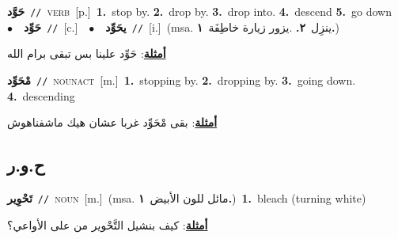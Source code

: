 \documentclass[10pt,a4paper,twoside]{article} %
\begin{document}
\begin{multicols}{2}
{\setlength\topsep{0pt}\textbf{\foreignlanguage{arabic}{حَوَّد}}\ {\color{gray}\texttt{//}\color{black}}\ \textsc{verb}\ [p.]\ \textbf{1.}~stop by.  \textbf{2.}~drop by.  \textbf{3.}~drop into.  \textbf{4.}~descend  \textbf{5.}~go down\ \ $\bullet$\ \ \setlength\topsep{0pt}\textbf{\foreignlanguage{arabic}{حَوِّد}}\ {\color{gray}\texttt{//}\color{black}}\ [c.]\ \ $\bullet$\ \ \setlength\topsep{0pt}\textbf{\foreignlanguage{arabic}{يحَوِّد}}\ {\color{gray}\texttt{//}\color{black}}\ [i.]\ \color{gray}(msa. \foreignlanguage{arabic}{ينزِل}~\foreignlanguage{arabic}{\textbf{٢.}}  .\foreignlanguage{arabic}{يزور زيارة خاطِفَة}~\foreignlanguage{arabic}{\textbf{١.}})\color{black}\  \begin{flushright}\color{gray}\foreignlanguage{arabic}{\textbf{\underline{\foreignlanguage{arabic}{أمثلة}}}: حَوِّد علينا بس تبقى برام الله}\end{flushright}\color{black}} \vspace{2mm}

{\setlength\topsep{0pt}\textbf{\foreignlanguage{arabic}{مْحَوِّد}}\ {\color{gray}\texttt{//}\color{black}}\ \textsc{noun\textunderscore act}\ [m.]\ \textbf{1.}~stopping by.  \textbf{2.}~dropping by.  \textbf{3.}~going down.  \textbf{4.}~descending\  \begin{flushright}\color{gray}\foreignlanguage{arabic}{\textbf{\underline{\foreignlanguage{arabic}{أمثلة}}}: بقى مْحَوِّد غربا عشان هيك ماشفناهوش}\end{flushright}\color{black}} \vspace{2mm}

\vspace{-3mm}
\subsection*{\color{blue}\foreignlanguage{arabic}{ح.و.ر}\color{blue}{}} 

{\setlength\topsep{0pt}\textbf{\foreignlanguage{arabic}{تَحْوِير}}\ {\color{gray}\texttt{//}\color{black}}\ \textsc{noun}\ [m.]\ \color{gray}(msa. \foreignlanguage{arabic}{مائل للون الأبيض}~\foreignlanguage{arabic}{\textbf{١.}})\color{black}\ \textbf{1.}~bleach (turning white)\  \begin{flushright}\color{gray}\foreignlanguage{arabic}{\textbf{\underline{\foreignlanguage{arabic}{أمثلة}}}: كيف بنشيل التَّحْوير من على الأواعي؟}\end{flushright}\color{black}} \vspace{2mm}


\end{multicols}
\end{document}
